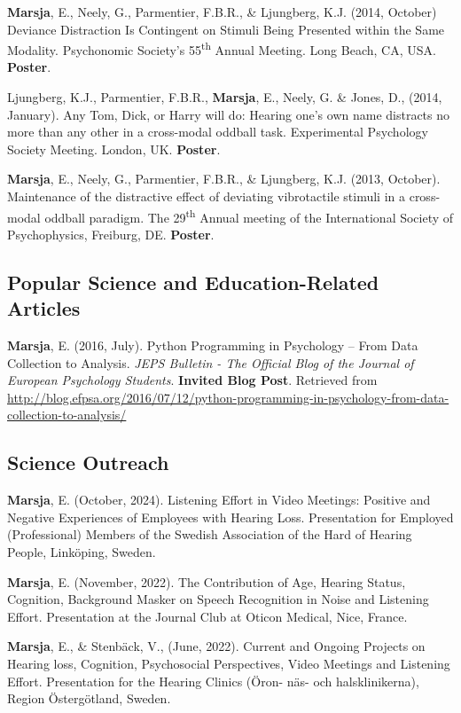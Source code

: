 \documentclass[]{article}
\begin{document}
\textbf{Marsja}, E., Neely, G., Parmentier, F.B.R., \& Ljungberg, K.J.
(2014, October) Deviance Distraction Is Contingent on Stimuli Being
Presented within the Same Modality. Psychonomic Society's
55\textsuperscript{th} Annual Meeting. Long Beach, CA, USA.
\textbf{Poster}.

Ljungberg, K.J., Parmentier, F.B.R., \textbf{Marsja}, E., Neely, G. \&
Jones, D., (2014, January). Any Tom, Dick, or Harry will do: Hearing
one's own name distracts no more than any other in a cross-modal oddball
task. Experimental Psychology Society Meeting. London, UK.
\textbf{Poster}.

\textbf{Marsja}, E., Neely, G., Parmentier, F.B.R., \& Ljungberg, K.J.
(2013, October). Maintenance of the distractive effect of deviating
vibrotactile stimuli in a cross-modal oddball paradigm. The
29\textsuperscript{th} Annual meeting of the International Society of
Psychophysics, Freiburg, DE. \textbf{Poster}.

\subsection{Popular Science and Education-Related
Articles}\label{popular-science-and-education-related-articles}

\textbf{Marsja}, E. (2016, July). Python Programming in Psychology --
From Data Collection to Analysis. \emph{JEPS Bulletin - The Official
Blog of the Journal of European Psychology Students}. \textbf{Invited
Blog Post}. Retrieved from
\sloppy \url{http://blog.efpsa.org/2016/07/12/python-programming-in-psychology-from-data-collection-to-analysis/}

\subsection{Science Outreach}\label{science-outreach}

\textbf{Marsja}, E. (October, 2024). Listening Effort in Video Meetings:
Positive and Negative Experiences of Employees with Hearing Loss.
Presentation for Employed (Professional) Members of the Swedish
Association of the Hard of Hearing People, Linköping, Sweden.

\textbf{Marsja}, E. (November, 2022). The Contribution of Age, Hearing
Status, Cognition, Background Masker on Speech Recognition in Noise and
Listening Effort. Presentation at the Journal Club at Oticon Medical,
Nice, France.

\textbf{Marsja}, E., \& Stenbäck, V., (June, 2022). Current and Ongoing
Projects on Hearing loss, Cognition, Psychosocial Perspectives, Video
Meetings and Listening Effort. Presentation for the Hearing Clinics
(Öron- näs- och halsklinikerna), Region Östergötland, Sweden.
\end{document}
